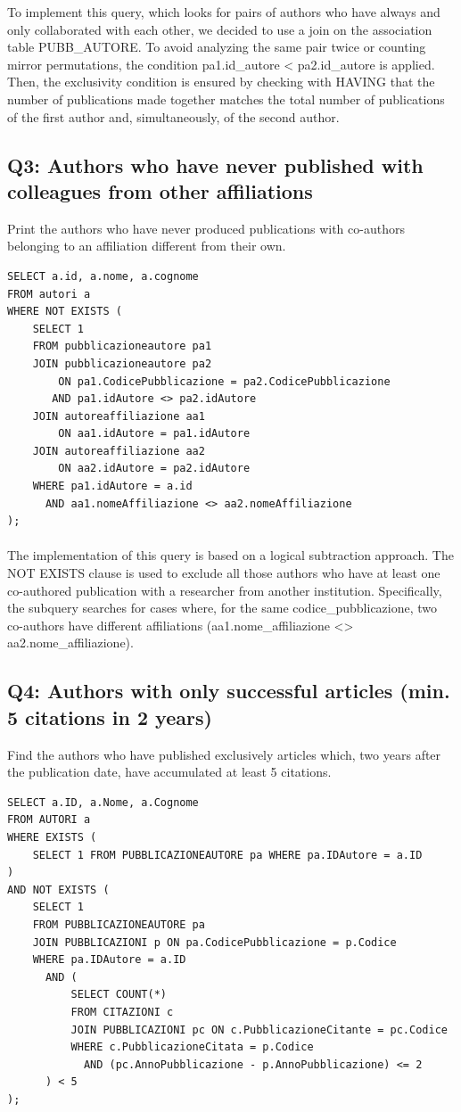 \documentclass[a4paper,12pt]{article}
\begin{document}
To implement this query, which looks for pairs of authors who have always and only collaborated with each other, we decided to use a join on the association table PUBB\_AUTORE. To avoid analyzing the same pair twice or counting mirror permutations, the condition pa1.id\_autore < pa2.id\_autore is applied. Then, the exclusivity condition is ensured by checking with HAVING that the number of publications made together matches the total number of publications of the first author and, simultaneously, of the second author.


\subsection*{Q3: Authors who have never published with colleagues from other affiliations}
Print the authors who have never produced publications with co-authors belonging to an affiliation different from their own.
\begin{lstlisting}
SELECT a.id, a.nome, a.cognome
FROM autori a
WHERE NOT EXISTS (
    SELECT 1
    FROM pubblicazioneautore pa1
    JOIN pubblicazioneautore pa2
        ON pa1.CodicePubblicazione = pa2.CodicePubblicazione
       AND pa1.idAutore <> pa2.idAutore
    JOIN autoreaffiliazione aa1
        ON aa1.idAutore = pa1.idAutore
    JOIN autoreaffiliazione aa2
        ON aa2.idAutore = pa2.idAutore
    WHERE pa1.idAutore = a.id
      AND aa1.nomeAffiliazione <> aa2.nomeAffiliazione
);
\end{lstlisting}
\paragraph{}
The implementation of this query is based on a logical subtraction approach. The NOT EXISTS clause is used to exclude all those authors who have at least one co-authored publication with a researcher from another institution. Specifically, the subquery searches for cases where, for the same codice\_pubblicazione, two co-authors have different affiliations (aa1.nome\_affiliazione <> aa2.nome\_affiliazione).


\subsection*{Q4: Authors with only successful articles (min. 5 citations in 2 years)}
Find the authors who have published exclusively articles which, two years after the publication date, have accumulated at least 5 citations.
\begin{lstlisting}
SELECT a.ID, a.Nome, a.Cognome
FROM AUTORI a
WHERE EXISTS (
    SELECT 1 FROM PUBBLICAZIONEAUTORE pa WHERE pa.IDAutore = a.ID
)
AND NOT EXISTS (
    SELECT 1
    FROM PUBBLICAZIONEAUTORE pa
    JOIN PUBBLICAZIONI p ON pa.CodicePubblicazione = p.Codice
    WHERE pa.IDAutore = a.ID
      AND (
          SELECT COUNT(*)
          FROM CITAZIONI c
          JOIN PUBBLICAZIONI pc ON c.PubblicazioneCitante = pc.Codice
          WHERE c.PubblicazioneCitata = p.Codice
            AND (pc.AnnoPubblicazione - p.AnnoPubblicazione) <= 2
      ) < 5
);
\end{lstlisting}
\end{document}
